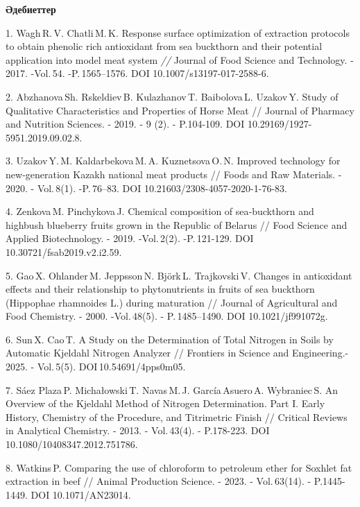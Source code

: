 \begin{center}
{\bfseries Әдебиеттер}
\end{center}

\begin{references}
1. Wagh\,R.\,V. Chatli\,M.\,K. Response surface optimization of
extraction protocols to obtain phenolic rich antioxidant from sea
buckthorn and their potential application into model meat system
\emph{//} Journal of Food Science and Technology. - 2017. -Vol.\,54.
-P.\,1565--1576. DOI 10.1007/s13197-017-2588-6.

2. Abzhanova\,Sh. Rskeldiev\,B. Kulazhanov\,T. Baibolova\,L. Uzakov\,Y.
Study of Qualitative Characteristics and Properties of Horse Meat //
Journal of Pharmacy and Nutrition Sciences. - 2019. - 9 (2). -
P.104-109. DOI 10.29169/1927-5951.2019.09.02.8.

3. Uzakov\,Y.\,M. Kaldarbekova\,M.\,A. Kuznetsova\,O.\,N. Improved
technology for new‑generation Kazakh national meat products // Foods and
Raw Materials. - 2020. - Vol.\,8(1). -P.\,76--83. DOI
10.21603/2308-4057-2020-1-76-83.

4. Zenkova\,M. Pinchykova\,J. Chemical composition of sea‑buckthorn and
highbush blueberry fruits grown in the Republic of Belarus // Food
Science and Applied Biotechnology. - 2019. -Vol.\,2(2). -P.\,121-129.
DOI 10.30721/fsab2019.v2.i2.59.

5. Gao\,X. Ohlander\,M. Jeppsson\,N. Björk\,L. Trajkovski\,V. Changes in
antioxidant effects and their relation\-ship to phytonutrients in fruits
of sea buckthorn (Hippophae rhamnoides L.) during maturation //
Journal of Agricultural and Food Chemistry. - 2000. -Vol.\,48(5). -
P.\,1485--1490. DOI 10.1021/jf991072g.

6. Sun\,X. Cao\,T. A Study on the Determination of Total Nitrogen in
Soils by Automatic Kjeldahl Nitrogen Analyzer // Frontiers in Science
and Engineering.- 2025. - Vol.\,5(5). DOI\,10.54691/4pps0m05.

7. Sáez Plaza\,P. Michałowski\,T. Navas\,M.\,J. García\,Asuero\,A.
Wybraniec\,S. An Overview of the Kjeldahl Method of Nitrogen
Determination. Part I. Early History, Chemistry of the Procedure, and
Titrimetric Finish // Critical Reviews in Analytical Chemistry. -
2013. - Vol.\,43(4). - P.178-223. DOI \\10.1080/10408347.2012.751786.

8. Watkins\,P. Comparing the use of chloroform to petroleum ether for
Soxhlet fat extraction in beef // Animal Production Science. - 2023. -
Vol.\,63(14). - P.1445-1449. DOI 10.1071/AN23014.


\end{references}
